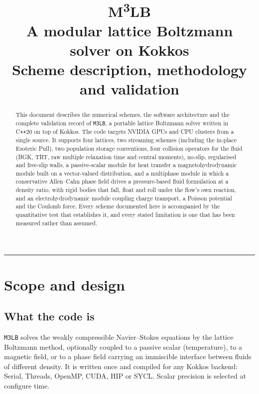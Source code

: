 \documentclass[11pt,a4paper]{article}
\title{\vspace{-1.4cm}\textbf{M\textsuperscript{3}LB}\\[2mm]
\large A modular lattice Boltzmann solver on Kokkos\\[1mm]
\normalsize Scheme description, methodology and validation}
\author{}
\date{}
\newcommand{\code}[1]{\texttt{\small #1}}
\begin{document}
\maketitle
\vspace{-1.2cm}

\begin{abstract}
\noindent
This document describes the numerical schemes, the software architecture and the
complete validation record of \code{M3LB}, a portable lattice Boltzmann
solver written in C\texttt{++}20 on top of Kokkos. The code targets NVIDIA GPUs
and CPU clusters from a single source. It supports four lattices, two streaming
schemes (including the in-place Esoteric Pull), two population storage
conventions, four collision operators for the fluid (BGK, TRT, raw multiple
relaxation time and central moments), no-slip, regularised and free-slip walls, a passive-scalar module for heat transfer
a magnetohydrodynamic module built on a vector-valued distribution, and a
multiphase module in which a conservative Allen--Cahn phase field drives a
pressure-based fluid formulation at a density ratio, with rigid bodies that fall,
float and roll under the flow's own reaction, and an electrohydrodynamic module
coupling charge transport, a Poisson potential and the Coulomb force. Every scheme documented here is
accompanied by the quantitative test that establishes it, and every stated
limitation is one that has been measured rather than assumed.
\end{abstract}

\tableofcontents
\bigskip
\hrule

\section{Scope and design}

\subsection{What the code is}

\code{M3LB} solves the weakly compressible Navier--Stokes equations by the
lattice Boltzmann method, optionally coupled to a passive scalar (temperature),
to a magnetic field, or to a phase field carrying an immiscible interface between
fluids of different density. It is written once and compiled for any Kokkos backend:
Serial, Threads, OpenMP, CUDA, HIP or SYCL. Scalar precision is selected at
configure time.
\end{document}
